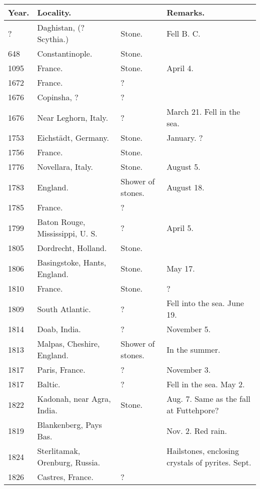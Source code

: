 \documentclass[a4paper, 12pt, oneside]{article}
\begin{document}
\begin{center}
    \footnotesize
    \begin{longtable}{|p{12mm}|p{45mm}|p{12mm}|p{35mm}|}
    \hline
        Year. & Locality. & ~ & Remarks. \\ \hline
        ? & Daghistan, (? Scythia.) & Stone. & Fell B. C. \\
        648 & Constantinople. & Stone. & ~ \\
        1095 & France. & Stone. & April 4. \\
        1672 & France. & ? & ~ \\
        1676 & Copinsha, ? & ? & ~ \\
        1676 & Near Leghorn, Italy. & ? & March 21. Fell in the sea. \\
        1753 & Eichstädt, Germany. & Stone. & January. ? \\
        1756 & France. & Stone. & ~ \\
        1776 & Novellara, Italy. & Stone. & August 5. \\
        1783 & England. & Shower of stones. & August 18. \\
        1785 & France. & ? & ~ \\
        1799 & Baton Rouge, Mississippi, U. S. & ? & April 5. \\
        1805 & Dordrecht, Holland. & Stone. & ~ \\
        1806 & Basingstoke, Hants, England. & Stone. & May 17. \\
        1810 & France. & Stone. & ? \\
        1809 & South Atlantic. & ? & Fell into the sea. June 19. \\
        1814 & Doab, India. & ? & November 5. \\
        1813 & Malpas, Cheshire, England. & Shower of stones. & In the summer. \\
        1817 & Paris, France. & ? & November 3. \\
        1817 & Baltic. & ? & Fell in the sea. May 2. \\
        1822 & Kadonah, near Agra, India. & Stone. & Aug. 7. Same as the fall at Futtehpore? \\
        1819 & Blankenberg, Pays Bas. & ~ & Nov. 2. Red rain. \\
        1824 & Sterlitamak, Orenburg, Russia. & ~ & Hailstones, enclosing crystals of pyrites. Sept. \\
        1826 & Castres, France. & ? & ~ \\

\end{longtable}
\end{center}
\end{document}
